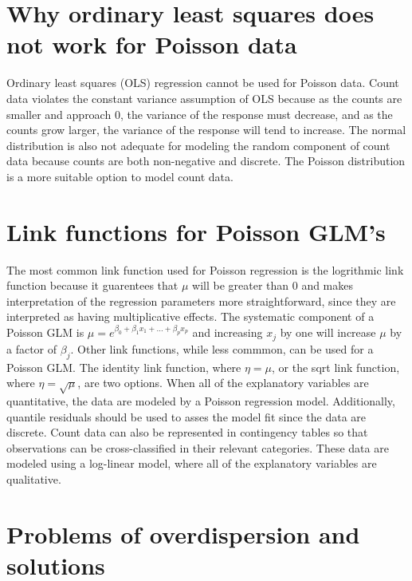 \documentclass[
]{book}
\begin{document}
\hypertarget{why-ordinary-least-squares-does-not-work-for-poisson-data}{%
\section{Why ordinary least squares does not work for Poisson data}\label{why-ordinary-least-squares-does-not-work-for-poisson-data}}

Ordinary least squares (OLS) regression cannot be used for Poisson data. Count data violates the constant variance assumption of OLS because as the counts are smaller and approach 0, the variance of the response must decrease, and as the counts grow larger, the variance of the response will tend to increase. The normal distribution is also not adequate for modeling the random component of count data because counts are both non-negative and discrete. The Poisson distribution is a more suitable option to model count data.

\hypertarget{link-functions-for-poisson-glms}{%
\section{Link functions for Poisson GLM's}\label{link-functions-for-poisson-glms}}

The most common link function used for Poisson regression is the logrithmic link function because it guarentees that \(\mu\) will be greater than 0 and makes interpretation of the regression parameters more straightforward, since they are interpreted as having multiplicative effects. The systematic component of a Poisson GLM is \(\mu = e^{\beta_0 + \beta_1x_1 + ... + \beta_px_p}\) and increasing \(x_j\) by one will increase \(\mu\) by a factor of \(\beta_j\). Other link functions, while less commmon, can be used for a Poisson GLM. The identity link function, where \(\eta = \mu\), or the sqrt link function, where \(\eta = \sqrt{\mu}\), are two options. When all of the explanatory variables are quantitative, the data are modeled by a Poisson regression model. Additionally, quantile residuals should be used to asses the model fit since the data are discrete. Count data can also be represented in contingency tables so that observations can be cross-classified in their relevant categories. These data are modeled using a log-linear model, where all of the explanatory variables are qualitative.

\hypertarget{problems-of-overdispersion-and-solutions}{%
\section{Problems of overdispersion and solutions}\label{problems-of-overdispersion-and-solutions}}
\end{document}
